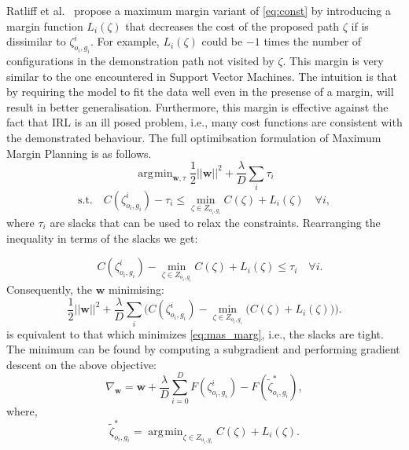 \documentclass{article}  %
\DeclareMathOperator*{\argmin}{\arg\!\min}
\begin{document}
Ratliff et al.\ \cite{ratliff2006maximum} propose a maximum margin variant of \eqref{eq:const} by introducing a margin function $L_i(\zeta)$ that decreases the cost of the proposed path $\zeta$ if is dissimilar to $\zeta^i_{o_i,g_i}$. For example, $L_i(\zeta)$ could be $-1$ times the number of configurations in the demonstration path not visited by $\zeta$. This margin is very similar to the one encountered in Support Vector Machines. The intuition is that by requiring the model to fit the data well even in the presense of a margin, will result in better generalisation. Furthermore, this margin is effective against the fact that IRL is an ill posed problem, i.e., many cost functions are consistent with the demonstrated behaviour. The full optimibsation formulation of Maximum Margin Planning is as follows.
\begin{equation}
	\argmin_{\mathbf{w},\tau} \frac{1}{2}||\mathbf{w}||^2 + \frac{\lambda}{D} \sum_i \tau_i \label{eq:mas_marg}
\end{equation}
\begin{equation}
	\text{s.t.} \quad C(\zeta^i_{o_i,g_i}) - \tau_i \leq \min_{\zeta \in Z_{o_i,g_i}} C(\zeta) + L_i(\zeta) \quad \forall i,
\end{equation}
where $\tau_i$ are slacks that can be used to relax the constraints. Rearranging the inequality in terms of the slacks we get:

\begin{equation}
	 \quad C(\zeta^i_{o_i,g_i}) - \min_{\zeta \in Z_{o_i,g_i}} C(\zeta) + L_i(\zeta)  \leq \tau_i  \quad \forall i.
\end{equation}
Consequently, the $\mathbf{w}$ minimising:
\begin{equation}
	\frac{1}{2}||\mathbf{w}||^2 + \frac{\lambda}{D} \sum_i \big( C(\zeta^i_{o_i,g_i}) - \min_{\zeta \in Z_{o_i,g_i}}\big(C(\zeta) + L_i(\zeta)\big) \big) \big. \label{eq:unconstrained}
\end{equation}
is equivalent to that which minimizes \eqref{eq:mas_marg}, i.e., the slacks are tight.
The minimum can be found by computing a subgradient and performing gradient descent on the above objective:
\begin{equation}
	\nabla_{\mathbf{w}} =\mathbf{w} +  \frac{\lambda}{D} \sum_{i=0}^D F(\zeta^i_{o_i,g_i}) - F(\tilde{\zeta}^*_{o_i,g_i}), \label{eq:update1}
\end{equation}
where,
\begin{equation}
	\tilde{\zeta}^*_{o_i,g_i} = \argmin_{\zeta \in Z_{o_i,g_i}} C(\zeta) + L_i(\zeta). \label{eq:augmented_max}
\end{equation}
\end{document}

